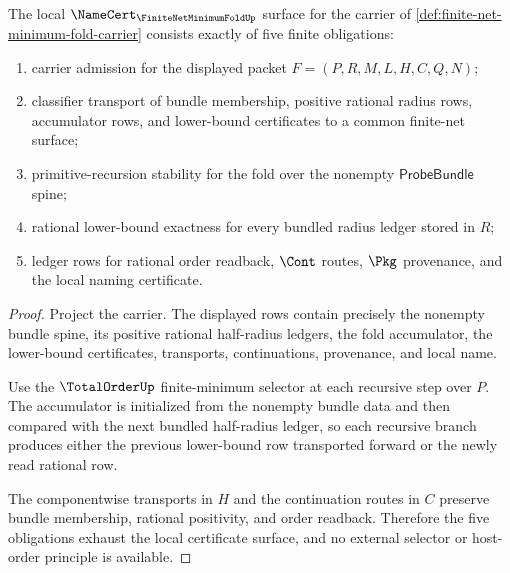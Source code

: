 \begin{theorem}
\label{thm:finite-net-minimum-fold-namecert-obligations}
The local $\NameCert_{\FiniteNetMinimumFoldUp}$ surface for the carrier of \autoref{def:finite-net-minimum-fold-carrier} consists exactly of five finite obligations:
\begin{enumerate}
\item carrier admission for the displayed packet $F=(P,R,M,L,H,C,Q,N)$;
\item classifier transport of bundle membership, positive rational radius rows, accumulator rows, and lower-bound certificates to a common finite-net surface;
\item primitive-recursion stability for the fold over the nonempty $\mathsf{ProbeBundle}$ spine;
\item rational lower-bound exactness for every bundled radius ledger stored in $R$;
\item ledger rows for rational order readback, $\Cont$ routes, $\Pkg$ provenance, and the local naming certificate.
\end{enumerate}
\end{theorem}
\begin{proof}
Project the carrier. The displayed rows contain precisely the nonempty bundle spine, its positive rational half-radius ledgers, the fold accumulator, the lower-bound certificates, transports, continuations, provenance, and local name.

Use the $\TotalOrderUp$ finite-minimum selector at each recursive step over $P$. The accumulator is initialized from the nonempty bundle data and then compared with the next bundled half-radius ledger, so each recursive branch produces either the previous lower-bound row transported forward or the newly read rational row.

The componentwise transports in $H$ and the continuation routes in $C$ preserve bundle membership, rational positivity, and order readback. Therefore the five obligations exhaust the local certificate surface, and no external selector or host-order principle is available.
\end{proof}

